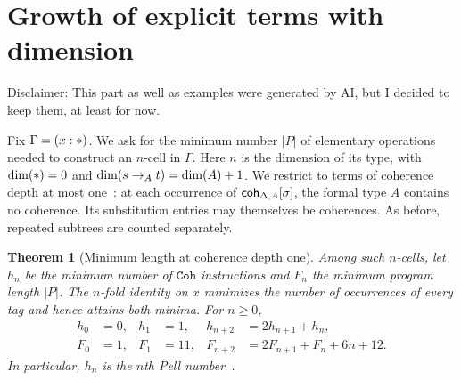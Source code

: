 \documentclass{article}%
\newtheorem{theorem}{Theorem}
\theoremstyle{remark}
\theoremstyle{definition}
\theoremstyle{definition}
\theoremstyle{plain}
\begin{document}





\appendix
\section{Growth of explicit \catt terms with dimension}
\label{sec:catt-depth-one-minimum}

Disclaimer: This part as well as examples were generated by AI, but I decided to
keep them, at least for now.



Fix \(\Gamma=(x:\obj)\). We ask for the minimum number \(|P|\) of
elementary operations needed to construct an \(n\)-cell in \(\Gamma\).
Here \(n\) is the dimension of its type, with \(\dim(\obj)=0\) and
\(\dim(\arr[A]{s}{t})=\dim(A)+1\). We restrict to terms of coherence
depth at most one~\cite[Section~IV.C]{finster_typetheoretical_2017}:
at each occurrence of \(\coh_{\Delta,A}[\sigma]\), the formal type
\(A\) contains no coherence. Its substitution entries may themselves
be coherences. As before, repeated subtrees are counted separately.

\begin{theorem}[Minimum length at coherence depth one]
\label{thm:catt-depth-one-minimum}
Among such \(n\)-cells, let \(h_n\) be the minimum number of
\(\mathtt{Coh}\) instructions and \(F_n\) the minimum program
length \(|P|\). The \(n\)-fold identity on \(x\) minimizes the
number of occurrences of every tag and hence attains both minima.
For \(n\ge0\),
\[
\begin{aligned}
 h_0&=0, & h_1&=1,  & h_{n+2}&=2h_{n+1}+h_n,\\
 F_0&=1, & F_1&=11, & F_{n+2}&=2F_{n+1}+F_n+6n+12.
\end{aligned}
\]
In particular, \(h_n\) is the \(n\)th Pell
number~\cite[Chapter~7]{koshy_pell_2014}.
\end{theorem}
\end{document}
